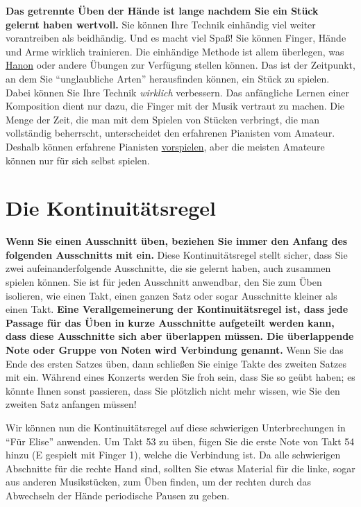 \textbf{Das getrennte Üben der Hände ist lange nachdem Sie ein Stück gelernt haben wertvoll.}
Sie können Ihre Technik einhändig viel weiter vorantreiben als beidhändig.
Und es macht viel Spaß!
Sie können Finger, Hände und Arme wirklich trainieren.
Die einhändige Methode ist allem überlegen, was \hyperlink{c1iii7h}{Hanon} oder andere Übungen zur Verfügung stellen können.
Das ist der Zeitpunkt, an dem Sie \enquote{unglaubliche Arten} herausfinden können, ein Stück zu spielen.
Dabei können Sie Ihre Technik \textit{wirklich} verbessern.
Das anfängliche Lernen einer Komposition dient nur dazu, die Finger mit der Musik vertraut zu machen.
Die Menge der Zeit, die man mit dem Spielen von Stücken verbringt, die man vollständig beherrscht, unterscheidet den erfahrenen Pianisten vom Amateur.
Deshalb können erfahrene Pianisten \hyperlink{c1iii14}{vorspielen}, aber die meisten Amateure können nur für sich selbst spielen.


\section{Die Kontinuitätsregel}\hypertarget{c1ii8}{}

\textbf{Wenn Sie einen Ausschnitt üben, beziehen Sie immer den Anfang des folgenden Ausschnitts mit ein.}
Diese Kontinuitätsregel stellt sicher, dass Sie zwei aufeinanderfolgende Ausschnitte, die sie gelernt haben, auch zusammen spielen können.
Sie ist für jeden Ausschnitt anwendbar, den Sie zum Üben isolieren, wie einen Takt, einen ganzen Satz oder sogar Ausschnitte kleiner als einen Takt.
\textbf{Eine Verallgemeinerung der Kontinuitätsregel ist, dass jede Passage für das Üben in kurze Ausschnitte aufgeteilt werden kann, dass diese Ausschnitte sich aber überlappen müssen.
Die überlappende Note oder Gruppe von Noten wird Verbindung genannt.}
Wenn Sie das Ende des ersten Satzes üben, dann schließen Sie einige Takte des zweiten Satzes mit ein.
Während eines Konzerts werden Sie froh sein, dass Sie so geübt haben; es könnte Ihnen sonst passieren, dass Sie plötzlich nicht mehr wissen, wie Sie den zweiten Satz anfangen müssen!

Wir können nun die Kontinuitätsregel auf diese schwierigen Unterbrechungen in \enquote{Für Elise} anwenden.
Um Takt 53 zu üben, fügen Sie die erste Note von Takt 54 hinzu (E gespielt mit Finger 1), welche die Verbindung ist.
Da alle schwierigen Abschnitte für die rechte Hand sind, sollten Sie etwas Material für die linke, sogar aus anderen Musikstücken, zum Üben finden, um der rechten durch das Abwechseln der Hände periodische Pausen zu geben.


